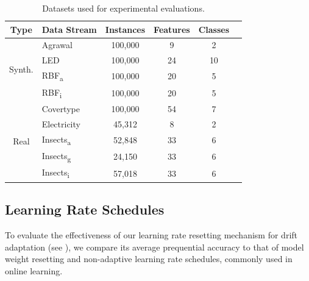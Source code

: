 \documentclass{article} %
\begin{document}
\begin{table}[hb]
   \centering
   \small
   \caption{Datasets used for experimental evaluations.}
   \begin{tabular}{@{}clcccc@{}}
      \toprule
      Type                    & Data Stream              & Instances               & Features & Classes \\
      \midrule
      \multirow{4}{*}{Synth.} & Agrawal                  & 100,000                 & 9        & 2       \\
                              & LED                      & 100,000                 & 24       & 10      \\
                              & RBF\textsubscript{a}     & 100,000                 & 20       & 5       \\
                              & RBF\textsubscript{i}     & 100,000                 & 20       & 5       \\
      \midrule
      \multirow{5}{*}{Real}   & Covertype                & 100,000\footnotemark[4] & 54       & 7       \\
                              & Electricity              & 45,312                  & 8        & 2       \\
                              & Insects\textsubscript{a} & 52,848                  & 33       & 6       \\
                              & Insects\textsubscript{g} & 24,150                  & 33       & 6       \\
                              & Insects\textsubscript{i} & 57,018                  & 33       & 6       \\
      \bottomrule
   \end{tabular}
   \label{tab:datasets}
\end{table}



\subsection{Learning Rate Schedules}

To evaluate the effectiveness of our learning rate resetting mechanism for drift adaptation (see ), we compare its average prequential accuracy to that of model weight resetting and non-adaptive learning rate schedules, commonly used in online learning.
\end{document}
